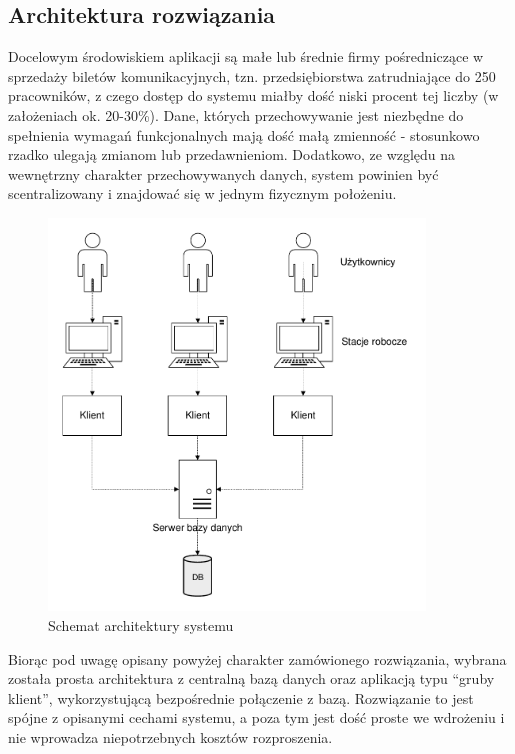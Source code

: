 \documentclass[10pt,a4paper]{article}
\begin{document}
\subsection{Architektura rozwiązania}
Docelowym środowiskiem aplikacji są małe lub średnie firmy pośredniczące w sprzedaży biletów komunikacyjnych, tzn. przedsiębiorstwa zatrudniające do 250 pracowników, z czego dostęp do systemu miałby dość niski procent tej liczby (w założeniach ok. 20-30\%). Dane, których przechowywanie jest niezbędne do spełnienia wymagań funkcjonalnych mają dość małą zmienność - stosunkowo rzadko ulegają zmianom lub przedawnieniom. Dodatkowo, ze względu na wewnętrzny charakter przechowywanych danych, system powinien być scentralizowany i znajdować się w jednym fizycznym położeniu.
\begin{figure}[H]
	\centering
	\includegraphics[width=10cm]{architecture-global.pdf}
	\caption{Schemat architektury systemu}
\end{figure}
Biorąc pod uwagę opisany powyżej charakter zamówionego rozwiązania, wybrana została prosta architektura z centralną bazą danych oraz aplikacją typu “gruby klient”, wykorzystującą bezpośrednie połączenie z bazą. Rozwiązanie to jest spójne z opisanymi cechami systemu, a poza tym jest dość proste we wdrożeniu i nie wprowadza niepotrzebnych kosztów rozproszenia.
\end{document}
